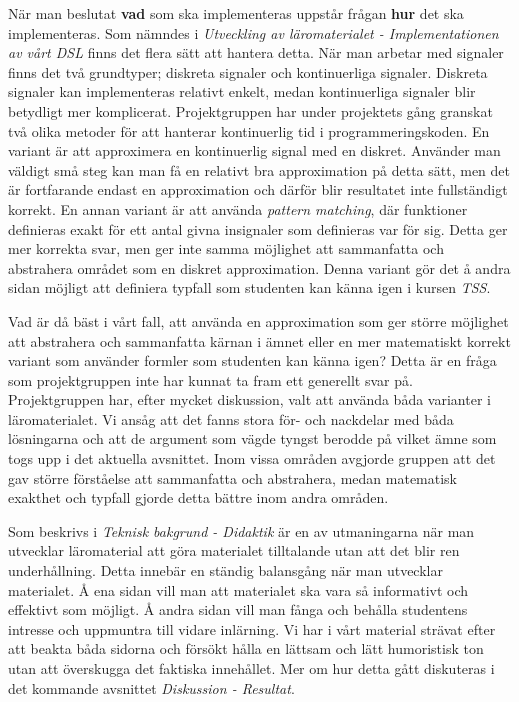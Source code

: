 \documentclass[]{article}
\begin{document}
När man beslutat \textbf{vad} som ska implementeras uppstår frågan \textbf{hur} det ska implementeras. Som nämndes i
\textit{Utveckling av läromaterialet - Implementationen av vårt DSL} finns det flera sätt att hantera detta. När man
arbetar med signaler finns det två grundtyper; diskreta signaler och kontinuerliga signaler. Diskreta signaler kan
implementeras relativt enkelt, medan kontinuerliga signaler blir betydligt mer komplicerat. Projektgruppen har under
projektets gång granskat två olika metoder för att hanterar kontinuerlig tid i programmeringskoden. En variant är att
approximera en kontinuerlig signal med en diskret. Använder man väldigt små steg kan man få en relativt bra
approximation på detta sätt, men det är fortfarande endast en approximation och därför blir resultatet inte
fullständigt korrekt. En annan variant är att använda \textit{pattern matching}, där funktioner definieras exakt för
ett antal givna insignaler som definieras var för sig. Detta ger mer korrekta svar, men ger inte samma möjlighet att
sammanfatta och abstrahera området som en diskret approximation. Denna variant gör det å andra sidan möjligt att
definiera typfall som studenten kan känna igen i kursen \textit{TSS}.

Vad är då bäst i vårt fall, att använda en approximation som ger större möjlighet att abstrahera och sammanfatta kärnan
i ämnet eller en mer matematiskt korrekt variant som använder formler som studenten kan känna igen? Detta är en fråga
som projektgruppen inte har kunnat ta fram ett generellt svar på. Projektgruppen har, efter mycket diskussion, valt att
använda båda varianter i läromaterialet. Vi ansåg att det fanns stora för- och nackdelar med båda lösningarna och att
de argument som vägde tyngst berodde på vilket ämne som togs upp i det aktuella avsnittet. Inom vissa områden avgjorde
gruppen att det gav större förståelse att sammanfatta och abstrahera, medan matematisk exakthet och typfall gjorde
detta bättre inom andra områden.

Som beskrivs i \textit{Teknisk bakgrund - Didaktik} är en av utmaningarna när man utvecklar läromaterial att göra
materialet tilltalande utan att det blir ren underhållning. Detta innebär en ständig balansgång när man utvecklar
materialet. Å ena sidan vill man att materialet ska vara så informativt och effektivt som möjligt. Å andra sidan vill
man fånga och behålla studentens intresse och uppmuntra till vidare inlärning. Vi har i vårt material strävat efter att
beakta båda sidorna och försökt hålla en lättsam och lätt humoristisk ton utan att överskugga det faktiska innehållet.
Mer om hur detta gått diskuteras i det kommande avsnittet \textit{Diskussion - Resultat}.
\end{document}
